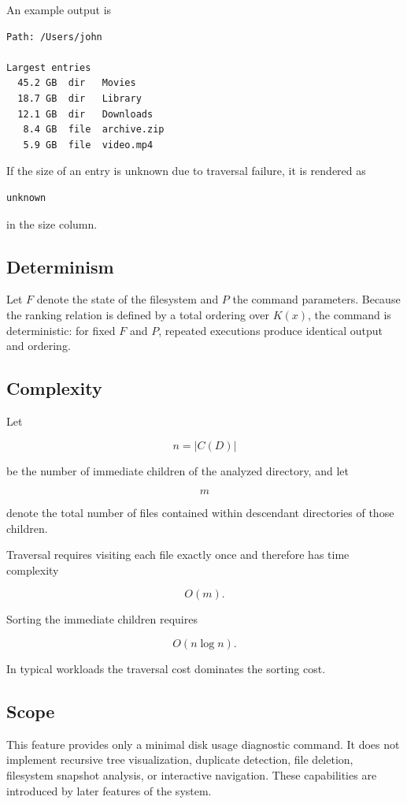 An example output is

\begin{verbatim}
Path: /Users/john

Largest entries
  45.2 GB  dir   Movies
  18.7 GB  dir   Library
  12.1 GB  dir   Downloads
   8.4 GB  file  archive.zip
   5.9 GB  file  video.mp4
\end{verbatim}

If the size of an entry is unknown due to traversal failure, it is rendered as

\begin{verbatim}
unknown
\end{verbatim}

in the size column.

\subsection{Determinism}

Let \(F\) denote the state of the filesystem and \(P\) the command parameters. Because the ranking relation is defined by a total ordering over \(K(x)\), the command is deterministic: for fixed \(F\) and \(P\), repeated executions produce identical output and ordering.

\subsection{Complexity}

Let

\[
n = |C(D)|
\]

be the number of immediate children of the analyzed directory, and let

\[
m
\]

denote the total number of files contained within descendant directories of those children.

Traversal requires visiting each file exactly once and therefore has time complexity

\[
O(m).
\]

Sorting the immediate children requires

\[
O(n \log n).
\]

In typical workloads the traversal cost dominates the sorting cost.

\subsection{Scope}

This feature provides only a minimal disk usage diagnostic command. It does not implement recursive tree visualization, duplicate detection, file deletion, filesystem snapshot analysis, or interactive navigation. These capabilities are introduced by later features of the system.